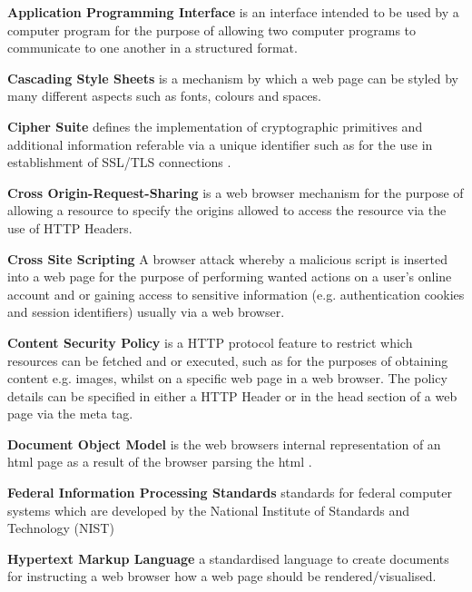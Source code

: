 \documentclass{mscreport}
\begin{document}
\begin{hangparas}{.25in}{1}
\textbf{Application Programming Interface} is an interface intended to be used by a computer program for the purpose of allowing two computer programs to communicate to one another in a structured format. \par
\vspace{0.5cm}
\textbf{Cascading Style Sheets} is a mechanism by which a web page can be styled by many different aspects such as fonts, colours and spaces. \par
\textbf{Cipher Suite} defines the implementation of cryptographic primitives and additional information referable via a unique identifier such as  for the use in establishment of SSL/TLS connections \cite{Ristic2017-aj}. \par
\textbf{Cross Origin-Request-Sharing} is a web browser mechanism for the purpose of allowing a resource to specify the origins allowed to access the resource via the use of HTTP Headers. \par
\textbf{Cross Site Scripting} A browser attack whereby a malicious script is inserted into a web page for the purpose of performing wanted actions on a user’s online account and or gaining access to sensitive information (e.g. authentication cookies and session identifiers) usually via a web browser. \par
\textbf{Content Security Policy} is a HTTP protocol feature to restrict which resources can be fetched and or executed, such as for the purposes of obtaining content e.g. images, whilst on a specific web page in a web browser. The policy details can be specified in either a HTTP Header or in the head section of a web page via the meta tag. \par
\vspace{0.5cm}
\textbf{Document Object Model} is the web browsers internal representation of an html page as a result of the browser parsing the html \cite{Apple_undated-ay}. \par
\vspace{0.5cm}
\textbf{Federal Information Processing Standards} standards for federal computer systems which are developed by the National Institute of Standards and Technology (NIST) \par
\vspace{0.5cm}
\textbf{Hypertext Markup Language} a standardised language to create documents \cite{Berners-Lee1995-hg} for instructing a web browser how a web page should be rendered/visualised. \par

\end{hangparas}
\end{document}
